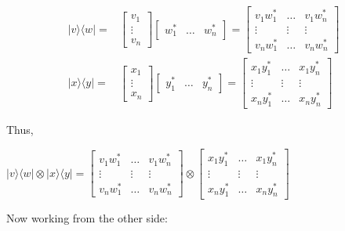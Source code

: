 \documentclass[main.tex]{subfiles}
\begin{document}
    $$
    \begin{aligned}
    |v\rangle\langle w|=& {\left[\begin{array}{c}
    v_{1} \\
    \vdots \\
    v_{n}
    \end{array}\right]\left[\begin{array}{lll}
    w_{1}^{*} & \ldots & w_{n}^{*}
    \end{array}\right]=\left[\begin{array}{ccc}
    v_{1} w_{1}^{*} & \ldots & v_{1} w_{n}^{*} \\
    \vdots & \vdots & \vdots \\
    v_{n} w_{1}^{*} & \ldots & v_{n} w_{n}^{*}
    \end{array}\right] } \\
    |x\rangle\langle y|=& {\left[\begin{array}{c}
    x_{1} \\
    \vdots \\
    x_{n}
    \end{array}\right]\left[\begin{array}{lll}
    y_{1}^{*} & \ldots & y_{n}^{*}
    \end{array}\right]=\left[\begin{array}{ccc}
    x_{1} y_{1}^{*} & \ldots & x_{1} y_{n}^{*} \\
    \vdots & \vdots & \vdots \\
    x_{n} y_{1}^{*} & \ldots & x_{n} y_{n}^{*}
    \end{array}\right] }
    \end{aligned}
    $$
    
    Thus,
    
    $|v\rangle\langle w|\otimes| x\rangle\langle y|=\left[\begin{array}{ccc}v_{1} w_{1}^{*} & \ldots & v_{1} w_{n}^{*} \\ \vdots & \vdots & \vdots \\ v_{n} w_{1}^{*} & \ldots & v_{n} w_{n}^{*}\end{array}\right] \otimes\left[\begin{array}{ccc}x_{1} y_{1}^{*} & \ldots & x_{1} y_{n}^{*} \\ \vdots & \vdots & \vdots \\ x_{n} y_{1}^{*} & \ldots & x_{n} y_{n}^{*}\end{array}\right]$ 
    
    Now working from the other side: 
    
\end{document}
